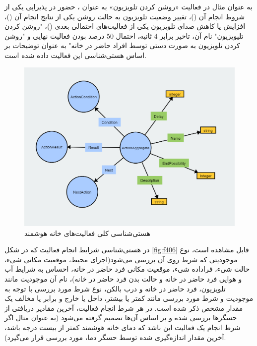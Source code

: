 \begin{itemize}
به عنوان مثال در فعالیت «روشن کردن تلویزیون» به عنوان ، حضور در پذیرایی یکی از شروط انجام آن ()، تغییر وضعیت تلویزیون به حالت روشن یکی از نتایج انجام آن ()، افزایش یا کاهش صدای تلویزیون یکی از فعالیت‌های احتمالی بعدی ()، "روشن کردن تلیویزیون" نام آن، تاخیر برابر 4 ثانیه، احتمال 50 درصد بودن فعالیت نهایی و "روشن کردن تلویزیون به صورت دستی توسط افراد حاضر در خانه" به عنوان توضیحات بر اساس هستی‌شناسی این فعالیت داده شده است.

\begin{figure}[htp]
\centerline{\includegraphics[width=1\textwidth]{figs/f405.png}}
\caption{هستی‌شناسی کلی فعالیت‌های خانه هوشمند}
\label{fig:f405}
\end{figure}

در هستی‌شناسی شرایط انجام فعالیت که در شکل \ref{fig:f406} قابل مشاهده است، نوع موجودیتی که شرط روی آن بررسی می‌شود(اجزای محیط، موقعیت مکانی شیء، حالت شیء، فراداده شیء، موقعیت مکانی فرد حاضر در خانه، احساس به شرایط آب و هوایی فرد حاضر در خانه و حالت بدن فرد حاضر در خانه)، نام آن موجودیت مانند تلویزیون، فرد حاضر در خانه و درب بالکن، نوع شرط مورد بررسی با توجه به موجودیت و شرط مورد بررسی مانند کمتر یا بیشتر، داخل یا خارج و برابر یا مخالف یک مقدار مشخص ذکر شده است. در هر شرط انجام فعالیت، آخرین مقادیر دریافتی از حسگرها بررسی شده و بر اساس آن‌ها تصمیم گرفته می‌شود (به عنوان مثال اگر شرط انجام یک فعالیت این باشد که دمای خانه هوشمند کمتر از بیست درجه باشد، آخرین مقدار اندازه‌گیری شده توسط حسگر دما، مورد بررسی قرار می‌گیرد).


\end{itemize}
